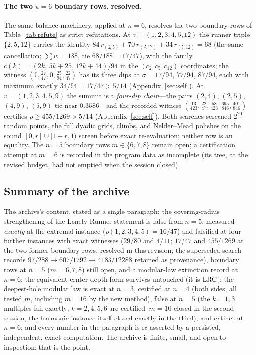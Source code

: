 \paragraph{The two $n=6$ boundary rows, resolved.}
The same balance machinery, applied at $n=6$, resolves the two boundary
rows of Table~\ref{tab:refute} as strict refutations. At
$v=(1,2,3,4,5,12)$ the runner triple $\{2,5,12\}$ carries the identity
$84\,r_{(2,5)}+70\,r_{(2,12)}+34\,r_{(5,12)}=68$ (the same
cancellation; $\sum w=188$, tie $68/188=17/47$), with the family
$c(k)=(2k,\,5k{+}25,\,12k{+}44)/94$ in the $(c_2,c_5,c_{12})$
coordinates; the witness $(0,\tfrac{27}{47},0,\tfrac{25}{94},
\tfrac{22}{47})$ has its three dips at $\sigma=17/94$, $77/94$,
$87/94$, each with maximum exactly $34/94=17/47>5/14$
(Appendix~\ref{sec:self}). At $v=(1,2,3,4,5,9)$ the summit is a
\emph{four-dip chain}---the pairs $(2,4)$, $(2,5)$, $(4,9)$, $(5,9)$
tie near $0.3586$---and the recorded witness
$(\tfrac{13}{423},\tfrac{22}{47},\tfrac{58}{423},\tfrac{695}{846},
\tfrac{401}{846})$ certifies $\rho\ge455/1269>5/14$
(Appendix~\ref{sec:self}). Both searches screened $2^{20}$ random
points, the full dyadic grids, climbs, and Nelder--Mead polishes on the
sound $[0,r]\cup[1-r,1)$ screen before exact re-evaluation; neither
row is an equality. The $n=5$ boundary rows $m\in\{6,7,8\}$ remain
open; a certification attempt at $m=6$ is recorded in the program data
as incomplete (its tree, at the revised budget, had not emptied when
the session closed).

\subsection{Summary of the archive}

The archive's content, stated as a single paragraph: the
covering-radius strengthening of the Lonely Runner statement is false
from $n=5$, measured \emph{exactly} at the extremal instance
($\rho(1,2,3,4,5)=16/47$) and falsified at four further instances with
exact witnesses ($29/80$ and $4/11$; $17/47$ and $455/1269$ at the two
former boundary rows, resolved in this revision; the superseded search
records $97/288\to607/1792\to4183/12288$ retained as provenance),
boundary rows at $n=5$ ($m=6,7,8$) still open, and a
modular-law extinction record at $n=6$; the equivalent
center-depth form survives untouched (it is $\mathrm{LRC}$); the deepest-hole
modular law is exact at $n=3$, certified at $n=4$ (both sides, all
tested $m$, including $m=16$ by the new method), false at $n=5$ (the
$k=1,3$ multiples fail exactly; $k=2,4,5,6$ are certified, $m=10$
closed in the second session, the harmonic instance itself closed
exactly in the third), and extinct at $n=6$; and every number in the paragraph is
re-asserted by a persisted, independent, exact computation. The archive
is finite, small, and open to inspection; that is the point.
